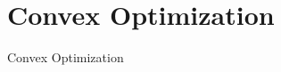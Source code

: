 \section{Convex Optimization}

    \frame{\sectionpage}

    \begin{frame}{Convex Optimization}

    \end{frame}
